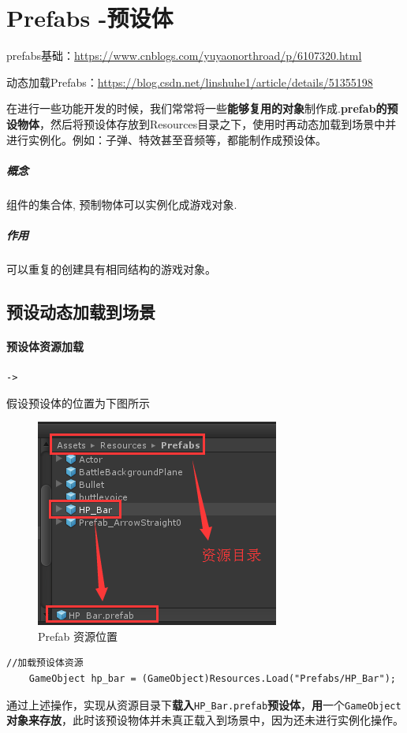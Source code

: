 \documentclass[UTF8,a4paper,12pt]{ctexbook}
\begin{document}
	\section{Prefabs -预设体}
		prefabs基础：\url{https://www.cnblogs.com/yuyaonorthroad/p/6107320.html}
		
		动态加载Prefabs：\url{https://blog.csdn.net/linshuhe1/article/details/51355198}
		
		在进行一些功能开发的时候，我们常常将一些\textbf{能够复用的对象}制作成.\textbf{prefab的预设物体}，然后将预设体存放到Resources目录之下，使用时再动态加载到场景中并进行实例化。例如：子弹、特效甚至音频等，都能制作成预设体。
		
		\subparagraph{概念} 组件的集合体, 预制物体可以实例化成游戏对象.
		\subparagraph{作用} 可以重复的创建具有相同结构的游戏对象。	
		
		\subsection{预设动态加载到场景}
			\paragraph{预设体资源加载}\verb|->|
			
				假设预设体的位置为下图所示
				\begin{figure}[H]
					\centering
					\includegraphics[scale=0.6]{Prefab-1.png}
					\caption{Prefab 资源位置}
				\end{figure}
			
				\begin{lstlisting}[xleftmargin = .079\textwidth, frame = L]
	//加载预设体资源
	GameObject hp_bar = (GameObject)Resources.Load("Prefabs/HP_Bar");				
				\end{lstlisting}
				
			通过上述操作，实现从资源目录下\textbf{载入}\verb|HP_Bar.prefab|\textbf{预设体}，\textbf{用}一个\verb|GameObject|\textbf{对象来存放}，此时该预设物体并未真正载入到场景中，因为还未进行实例化操作。
			
\end{document}
